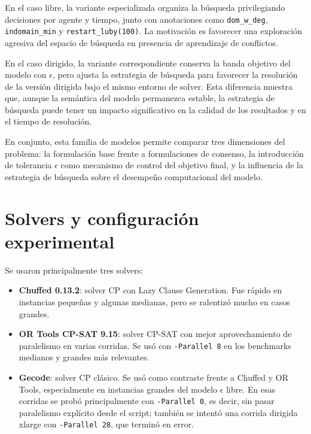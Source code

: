 \documentclass[10pt,letterpaper]{article}
\begin{document}
En el caso libre, la variante especializada organiza la b\'usqueda privilegiando decisiones por agente y tiempo, junto con anotaciones como \texttt{dom\_w\_deg}, \texttt{indomain\_min} y \texttt{restart\_luby(100)}. La motivaci\'on es favorecer una exploraci\'on agresiva del espacio de b\'usqueda en presencia de aprendizaje de conflictos.

En el caso dirigido, la variante correspondiente conserva la banda objetivo del modelo con \(\epsilon\), pero ajusta la estrategia de b\'usqueda para favorecer la resoluci\'on de la versi\'on dirigida bajo el mismo entorno de solver. Esta diferencia muestra que, aunque la sem\'antica del modelo permanezca estable, la estrategia de b\'usqueda puede tener un impacto significativo en la calidad de los resultados y en el tiempo de resoluci\'on.

En conjunto, esta familia de modelos permite comparar tres dimensiones del problema: la formulaci\'on base frente a formulaciones de consenso, la introducci\'on de tolerancia \(\epsilon\) como mecanismo de control del objetivo final, y la influencia de la estrategia de b\'usqueda sobre el desempe\~no computacional del modelo.

\section{Solvers y configuraci\'on experimental}

Se usaron principalmente tres solvers:

\begin{itemize}
    \item \textbf{Chuffed 0.13.2}: solver CP con Lazy Clause Generation. Fue r\'apido en instancias peque\~nas y algunas medianas, pero se ralentiz\'o mucho en casos grandes.
    \item \textbf{OR Tools CP-SAT 9.15}: solver CP-SAT con mejor aprovechamiento de paralelismo en varias corridas. Se us\'o con \texttt{-Parallel 8} en los benchmarks medianos y grandes m\'as relevantes.
    \item \textbf{Gecode}: solver CP cl\'asico. Se us\'o como contraste frente a Chuffed y OR Tools, especialmente en instancias grandes del modelo \(\epsilon\) libre. En esas corridas se prob\'o principalmente con \texttt{-Parallel 0}, es decir, sin pasar paralelismo expl\'icito desde el script; tambi\'en se intent\'o una corrida dirigida xlarge con \texttt{-Parallel 28}, que termin\'o en error.
\end{itemize}
\end{document}
